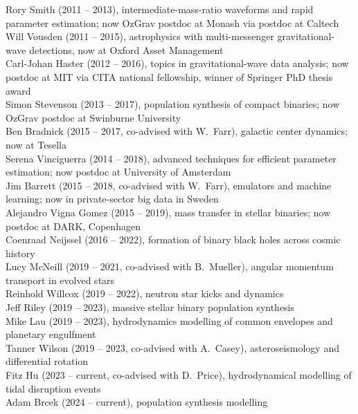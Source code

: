 \documentclass[margin,line]{res}
\begin{document}
\begin{resume}
Rory Smith (2011 -- 2013), intermediate-mass-ratio waveforms and rapid parameter estimation; now OzGrav postdoc at Monash via postdoc at Caltech\\
Will Vousden (2011 -- 2015), astrophysics with multi-messenger gravitational-wave detections, now at Oxford Asset Management\\
Carl-Johan Haster (2012 -- 2016), topics in gravitational-wave data analysis; now postdoc at MIT via CITA national fellowship, winner of Springer PhD thesis award\\
Simon Stevenson (2013 -- 2017), population synthesis of compact binaries; now OzGrav postdoc at Swinburne University\\
Ben Bradnick (2015 -- 2017, co-advised with W.~Farr), galactic center dynamics; now at Tesella\\
Serena Vinciguerra (2014 -- 2018), advanced techniques for efficient parameter estimation; now postdoc at University of Amsterdam\\
Jim Barrett (2015 -- 2018, co-advised with W.~Farr), emulators and machine learning; now in private-sector big data in Sweden \\
Alejandro Vigna Gomez (2015 -- 2019), mass transfer in stellar binaries; now postdoc at DARK, Copenhagen\\
Coenraad Neijssel (2016 -- 2022), formation of binary black holes across cosmic history\\
Lucy McNeill (2019 -- 2021, co-advised with B.~Mueller), angular momentum transport in evolved stars\\
Reinhold Willcox (2019 -- 2022), neutron star kicks and dynamics\\
Jeff Riley (2019 -- 2023), massive stellar binary population synthesis\\
Mike Lau (2019 -- 2023), hydrodynamics modelling of common envelopes and planetary engulfment\\
Tanner Wilson (2019 -- 2023, co-advised with A.~Casey), asteroseismology and differential rotation\\
Fitz Hu (2023 -- current, co-advised with D.~Price), hydrodynamical modelling of tidal disruption events\\ 
Adam Brcek (2024 -- current), population synthesis modelling\\

\end{resume}
\end{document}
